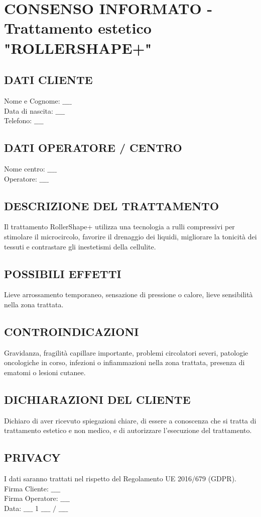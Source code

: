 \newpage

\section{CONSENSO INFORMATO - Trattamento estetico "ROLLERSHAPE+"}
\subsection{DATI CLIENTE}
\noindent Nome e Cognome: $\_\_\_\_$\\
Data di nascita: $\_\_\_\_$\\
Telefono: $\_\_\_\_$

\subsection{DATI OPERATORE / CENTRO}
\noindent Nome centro: $\_\_\_\_$\\
Operatore: $\_\_\_\_$

\subsection{DESCRIZIONE DEL TRATTAMENTO}
Il trattamento RollerShape+ utilizza una tecnologia a rulli compressivi per stimolare il microcircolo, favorire il drenaggio dei liquidi, migliorare la tonicità dei tessuti e contrastare gli inestetismi della cellulite.

\subsection{POSSIBILI EFFETTI}
Lieve arrossamento temporaneo, sensazione di pressione o calore, lieve sensibilità nella zona trattata.

\subsection{CONTROINDICAZIONI}
Gravidanza, fragilità capillare importante, problemi circolatori severi, patologie oncologiche in corso, infezioni o infiammazioni nella zona trattata, presenza di ematomi o lesioni cutanee.

\subsection{DICHIARAZIONI DEL CLIENTE}
Dichiaro di aver ricevuto spiegazioni chiare, di essere a conoscenza che si tratta di trattamento estetico e non medico, e di autorizzare l'esecuzione del trattamento.

\subsection{PRIVACY}
I dati saranno trattati nel rispetto del Regolamento UE 2016/679 (GDPR).\\
Firma Cliente: $\_\_\_\_$\\
Firma Operatore: $\_\_\_\_$\\
Data: $\_\_\_\_$ 1 $\_\_\_\_$ $/$ $\_\_\_\_$
